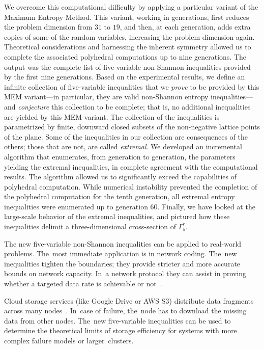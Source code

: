 \documentclass[reqno]{amsart}
\theoremstyle{definition}
\def\Ga#1{\Gamma^*_{\!#1}}
\begin{document}
We overcome this computational difficulty by applying a particular variant
of the Maximum Entropy Method. This variant, working in generations, first
reduces the problem dimension from $31$ to $19$, and then, at each
generation, adds extra copies of some of the random variables, increasing
the problem dimension again. Theoretical considerations and harnessing the
inherent symmetry allowed us to complete the associated polyhedral
computations up to nine generations. The output was the complete list of
five-variable non-Shannon inequalities provided by the first nine
generations. Based on the experimental results, we define an infinite
collection of five-variable inequalities that we \emph{prove} to be provided
by this MEM variant---in particular, they are valid non-Shannon entropy
inequalities---and \emph{conjecture} this collection to be complete; that
is, no additional inequalities are yielded by this MEM variant. The
collection of the inequalities is parametrized by finite, downward closed
subsets of the non-negative lattice points of the plane. Some of the
inequalities in our collection are consequences of the others; those that
are not, are called \emph{extremal}. We developed an incremental algorithm
that enumerates, from generation to generation, the parameters yielding the
extremal inequalities, in complete agreement with the computational results.
The algorithm allowed us to significantly exceed the capabilities of
polyhedral computation. While numerical instability prevented the completion
of the polyhedral computation for the tenth generation, all extremal entropy
inequalities were enumerated up to generation 60. Finally, we have looked at
the large-scale behavior of the extremal inequalities, and pictured how
these inequalities delimit a three-dimensional cross-section of $\Ga5$.

The new five-variable non-Shannon inequalities can be applied to real-world
problems. The~most immediate application is in network coding. The~new
inequalities tighten the boundaries; they provide stricter and more accurate
bounds on network capacity. In~a network protocol they can assist in
proving whether a targeted data rate is achievable or not~\cite{yeung-network}.

Cloud storage services (like Google Drive or AWS S3) distribute data
fragments across many nodes~\cite{cloud}. In~case of failure, the~node has
to download the missing data from other nodes. The~new five-variable inequalities
can be used to determine the theoretical limits of storage efficiency for
systems with more complex failure models or larger~clusters.
\end{document}
